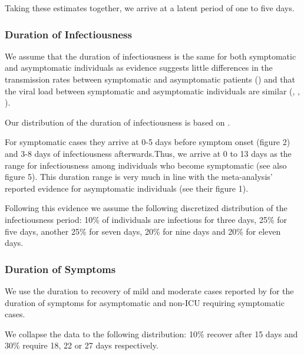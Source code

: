 
Taking these estimates together, we arrive at a latent period of one to five days.

\subsubsection{Duration of Infectiousness}

We assume that the duration of infectiousness is the same for both symptomatic and
asymptomatic individuals as evidence suggests little differences in the transmission
rates between symptomatic and asymptomatic patients
(\citet{Yin2020}) and that the viral load between symptomatic and asymptomatic
individuals are similar (\citet{Zou2020}, \citet{Byrne2020}, \citet{Singanayagam2020}).

Our distribution of the duration of infectiousness is based on \citet{Byrne2020}.

For symptomatic cases they arrive at 0-5 days before symptom onset (figure 2) and 3-8
days of infectiousness afterwards.\footnotemark Thus, we arrive at 0 to 13 days as the
range for infectiousness among individuals who become symptomatic (see also figure 5).
This duration range is very much in line with the meta-analysis’ reported evidence for
asymptomatic individuals (see their figure 1).


Following this evidence we assume the following discretized distribution of the
infectiousness period: 10\% of individuals are infectious for three days, 25\% for five
days, another 25\% for seven days, 20\% for nine days and 20\% for eleven days.


\subsubsection{Duration of Symptoms}

We use the duration to recovery of mild and moderate cases reported by \cite[Figure~S3,
Panel~2]{Bi2020} for the duration of symptoms for asymptomatic and non-ICU requiring
symptomatic cases.

We collapse the data to the following distribution: 10\% recover after 15 days and 30\%
require 18, 22 or 27 days respectively.

